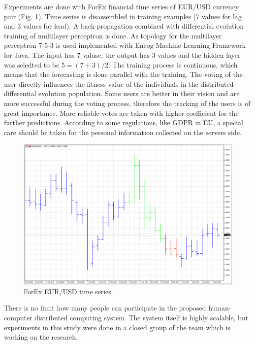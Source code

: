 \documentclass[runningheads]{llncs}
\begin{document}
Experiments are done with ForEx financial time series of EUR/USD currency pair (Fig. \ref{fig03}). Time series is disassembled in training examples (7 values for lag and 3 values for lead). A back-propagation combined with differential evolution training of multilayer perceptron is done. As topology for the multilayer perceptron 7-5-3 is used implemented with Encog Machine Learning Framework\cite{heaton01} for Java. The input has 7 valuse, the output has 3 values and the hidden layer was seledted to be $5 = (7 + 3) / 2$. The training process is continuous, which means that the forecasting is done parallel with the training. The voting of the user directly influences the fitness value of the individuals in the distributed differential evolution population. Some users are better in their vision and are more successful during the voting process, therefore the tracking of the users is of great importance. More reliable votes are taken with higher coefficient for the further predictions. According to some regulations, like GDPR in EU\cite{hristov01}, a special care should be taken for the personal information collected on the servers side. 

\begin{figure}
\includegraphics[width=1.0\textwidth]{fig03.png}
\centering
\caption{ForEx EUR/USD time series.} \label{fig03}
\end{figure}
\FloatBarrier

There is no limit how many people can participate in the proposed human-computer distributed computing system. The system itself is highly scalable, but experiments in this study were done in a closed group of the team which is working on the research. 
\end{document}
